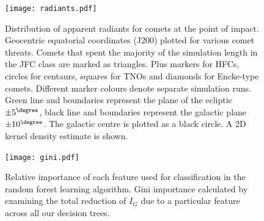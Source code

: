 \begin{figure}[h!]
    \centering
    \texttt{[image: radiants.pdf]}
    \caption[Distribution of apparent radiants]{Distribution of apparent radiants for comets at the point of impact. Geocentric equatorial coordinates (J200) plotted for various comet threats. Comets that spent the majority of the simulation length in the JFC class are marked as triangles. Plus markers for HFCs, circles for centaurs, squares for TNOs and diamonds for Encke-type comets. Different marker colours denote separate simulation runs. Green line and boundaries represent the plane of the ecliptic $\pm5^\degree$, black line and boundaries represent the galactic plane $\pm10^\degree$. The galactic centre is plotted as a black circle. A 2D kernel density estimate is shown.}
    \label{fig:radiants}
\end{figure}

\begin{figure}[h!]
    \centering
    \texttt{[image: gini.pdf]}
    \caption[Relative importance of orbital characteristics in learning algorithm]{Relative importance of each feature used for classification in the random forest learning algorithm. Gini importance calculated by examining the total reduction of $I_G$ due to a particular feature across all our decision trees.}
    \label{fig:gini}
\end{figure}


